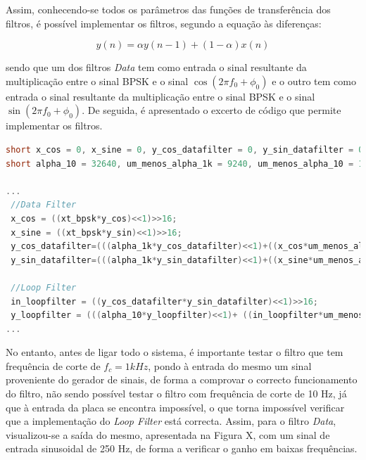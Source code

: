 \documentclass[11pt]{article}
\numberwithin{equation}{section}
\begin{document}

Assim, conhecendo-se todos os parâmetros das funções de transferência dos filtros, é possível implementar os filtros, segundo a equação às diferenças:

\vspace{-3mm}
\begin{equation}
y(n) = \alpha y(n-1) +  (1-\alpha)x(n)
\end{equation} 

sendo que um dos filtros \textit{Data} tem como entrada o sinal resultante da multiplicação entre o sinal BPSK e o sinal $\cos(2\pi f_0 + \phi_0)$ e o outro tem como entrada o sinal resultante da multiplicação entre o sinal BPSK e o sinal $\sin(2\pi f_0 + \phi_0)$. De seguida, é apresentado o excerto de código que permite implementar os filtros. 

\begin{lstlisting}[language=C]
short x_cos = 0, x_sine = 0, y_cos_datafilter = 0, y_sin_datafilter = 0;  short in_loopfilter = 0, y_loop filter = 0, alpha_1k = 23528; 
short alpha_10 = 32640, um_menos_alpha_1k = 9240, um_menos_alpha_10 = 127;

...
 //Data Filter
 x_cos = ((xt_bpsk*y_cos)<<1)>>16;
 x_sine = ((xt_bpsk*y_sin)<<1)>>16;
 y_cos_datafilter=(((alpha_1k*y_cos_datafilter)<<1)+((x_cos*um_menos_alpha_1k)<<1))>>16;
 y_sin_datafilter=(((alpha_1k*y_sin_datafilter)<<1)+((x_sine*um_menos_alpha_1k)<<1))>>16;

 //Loop Filter
 in_loopfilter = ((y_cos_datafilter*y_sin_datafilter)<<1)>>16;
 y_loopfilter = (((alpha_10*y_loopfilter)<<1)+ ((in_loopfilter*um_menos_alpha_10)<<1))>>16;
...

\end{lstlisting}

No entanto, antes de ligar todo o sistema, é importante testar o filtro que tem frequência de corte de $f_c = 1 kHz$, pondo à entrada do mesmo um sinal proveniente do gerador de sinais, de forma a comprovar o correcto funcionamento do filtro, não sendo possível testar o filtro com frequência de corte de 10 Hz, já que à entrada da placa se encontra impossível, o que torna impossível verificar que a implementação do \textit{Loop Filter} está correcta. Assim, para o filtro \textit{Data}, visualizou-se a saída do mesmo, apresentada na Figura X, com um sinal de entrada sinusoidal de 250 Hz, de forma a verificar o ganho em baixas frequências.
\end{document}
